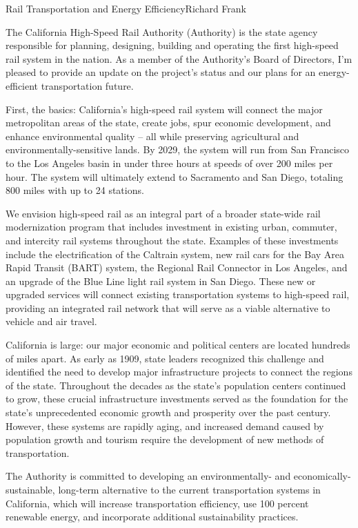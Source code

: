 \documentclass{papertex}
\begin{document}
\begin{news}{2}{Rail Transportation and Energy Efficiency}{Richard Frank}{}{}

The California High-Speed Rail Authority (Authority) is the state agency 
responsible for planning, designing, building and operating the first 
high-speed rail system in the nation. As a member of the Authority’s Board of 
Directors, I’m pleased to provide an update on the project’s status and our 
plans for an energy-efficient transportation future.

First, the basics: California’s high-speed rail system will connect the major 
metropolitan areas of the state, create jobs, spur economic development, and 
enhance environmental quality – all while preserving agricultural and 
environmentally-sensitive lands. By 2029, the system will run from San 
Francisco to the Los Angeles basin in under three hours at speeds of over 
200 miles per hour. The system will ultimately extend to Sacramento and San 
Diego, totaling 800 miles with up to 24 stations.

We envision high-speed rail as an integral part of a broader state-wide rail 
modernization program that includes investment in existing urban, commuter, 
and intercity rail systems throughout the state.  Examples of these 
investments include the electrification of the Caltrain system, new rail cars 
for the Bay Area Rapid Transit (BART) system, the Regional Rail Connector in 
Los Angeles, and an upgrade of the Blue Line light rail system in San Diego. 
These new or upgraded services will connect existing transportation systems to 
high-speed rail, providing an integrated rail network that will serve as a 
viable alternative to vehicle and air travel.

California is large: our major economic and political centers are located 
hundreds of miles apart. As early as 1909, state leaders recognized this 
challenge and identified the need to develop major infrastructure projects to 
connect the regions of the state. Throughout the decades as the state’s 
population centers continued to grow, these crucial infrastructure investments 
served as the foundation for the state’s unprecedented economic growth and 
prosperity over the past century. However, these systems are rapidly aging, 
and increased demand caused by population growth and tourism require the 
development of new methods of transportation.

The Authority is committed to developing an environmentally- and 
economically-sustainable, long-term alternative to the current transportation 
systems in California, which will increase transportation efficiency, use 100 
percent renewable energy, and incorporate additional sustainability practices.


\end{news}
\end{document}
